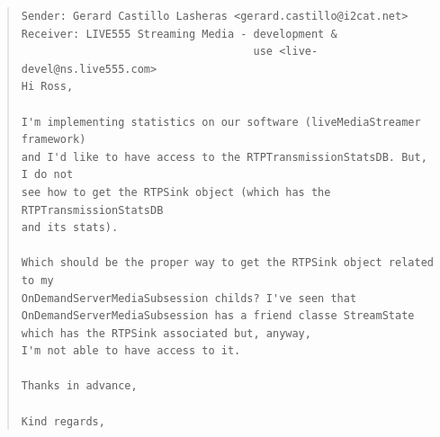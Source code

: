\begin{quote}
\begin{verbatim}
Sender: Gerard Castillo Lasheras <gerard.castillo@i2cat.net>
Receiver: LIVE555 Streaming Media - development & 
									use <live-devel@ns.live555.com> 
Hi Ross,

I'm implementing statistics on our software (liveMediaStreamer framework) 
and I'd like to have access to the RTPTransmissionStatsDB. But, I do not
see how to get the RTPSink object (which has the RTPTransmissionStatsDB 
and its stats).

Which should be the proper way to get the RTPSink object related to my
OnDemandServerMediaSubsession childs? I've seen that 
OnDemandServerMediaSubsession has a friend classe StreamState 
which has the RTPSink associated but, anyway, 
I'm not able to have access to it.

Thanks in advance,

Kind regards,
\end{verbatim}
\end{quote} 

